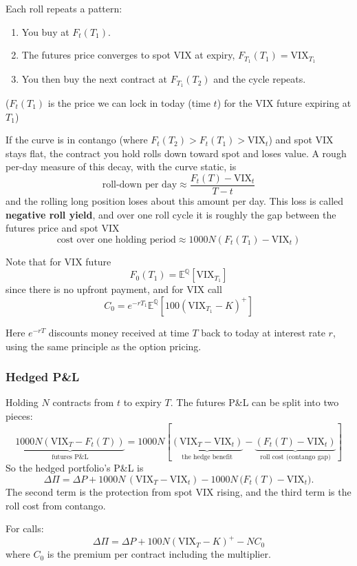Each roll repeats a pattern:
\begin{enumerate}
    \item You buy at $F_t (T_1)$.
    \item The futures price converges to spot VIX at expiry, $F_{T_1}(T_1) = \mathrm{VIX}_{T_1}$
    \item You then buy the next contract at $F_{T_1}(T_2)$ and the cycle repeats.
\end{enumerate}
($F_t(T_1)$ is the price we can lock in today (time $t$) for the VIX future expiring at $T_1$)

If the curve is in contango (where $F_t(T_2) > F_t(T_1) > \mathrm{VIX}_t$) and spot VIX stays flat, the contract you hold rolls down toward spot and loses value. A rough per-day measure of this decay, with the curve static, is
\[
    \text{roll-down per day} \approx \dfrac{F_t(T) - \mathrm{VIX}_t}{T - t}
\]
and the rolling long position loses about this amount per day. This loss is called \textbf{negative roll yield}, and over one roll cycle it is roughly the gap between the futures price and spot VIX
\[
    \text{cost over one holding period} \approx 1000 N (F_t(T_1) - \mathrm{VIX}_t)
\]

Note that for VIX future
\[
    F_0(T_1) = \mathbb{E}^{\mathbb{Q}}[\mathrm{VIX}_{T_1}]
\]
since there is no upfront payment, and for VIX call
\[
    C_0 = e^{-rT_1} \mathbb{E}^{\mathbb{Q}}[100(\mathrm{VIX}_{T_1} - K)^+]
\]

Here $e^{-rT}$ discounts money received at time $T$ back to today at interest rate $r$, using the same principle as the option pricing.

\subsubsection{Hedged P\&L}
Holding $N$ contracts from $t$ to expiry $T$. The futures P\&L can be split into two pieces:
\[
    \underbrace{1000 N (\mathrm{VIX}_T - F_t(T))}_{\text{futures P\&L}} = 1000 N\left[\underbrace{(\mathrm{VIX}_T - \mathrm{VIX}_t)}_{\text{the hedge benefit}} - \underbrace{(F_t(T) - \mathrm{VIX}_t)}_{\text{roll cost (contango gap)}}\right]
\]
So the hedged portfolio's P\&L is
\[
    \Delta\Pi = \Delta P
    + 1000N\,(\mathrm{VIX}_T - \mathrm{VIX}_t)
    - 1000N\,\bigl(F_t(T) - \mathrm{VIX}_t\bigr).
\]
The second term is the protection from spot VIX rising, and the third term is the
roll cost from contango.

For calls:
\[
    \Delta \Pi = \Delta P + 100 N (\mathrm{VIX}_T - K)^+ - N C_0
\]
where $C_0$ is the premium per contract including the multiplier.
